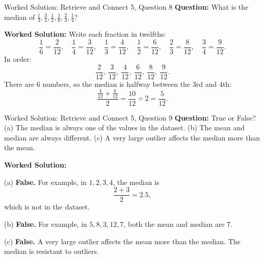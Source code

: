 \documentclass{beamer}
\begin{document}
\begin{frame}{Worked Solution: Retrieve and Connect 5, Question 8}
\textbf{Question:} What is the median of \(\frac{1}{3}, \frac{3}{4}, \frac{1}{2}, \frac{1}{6}, \frac{2}{3}, \frac{1}{4}\)?

\textbf{Worked Solution:}
Write each fraction in twelfths:
\[
\frac{1}{6}=\frac{2}{12},\quad
\frac{1}{4}=\frac{3}{12},\quad
\frac{1}{3}=\frac{4}{12},\quad
\frac{1}{2}=\frac{6}{12},\quad
\frac{2}{3}=\frac{8}{12},\quad
\frac{3}{4}=\frac{9}{12}.
\]
In order:
\[
\frac{2}{12},\ \frac{3}{12},\ \frac{4}{12},\ \frac{6}{12},\ \frac{8}{12},\ \frac{9}{12}.
\]
There are 6 numbers, so the median is halfway between the 3rd and 4th:
\[
\frac{\frac{4}{12} + \frac{6}{12}}{2}
= \frac{10}{12} \div 2
= \frac{5}{12}.
\]
\end{frame}

\begin{frame}{Worked Solution: Retrieve and Connect 5, Question 9}
\textbf{Question:} True or False?
(a) The median is always one of the values in the dataset.
(b) The mean and median are always different.
(c) A very large outlier affects the median more than the mean.

\textbf{Worked Solution:}

(a) \textbf{False.}
For example, in \(1, 2, 3, 4\), the median is
\[
\frac{2 + 3}{2} = 2.5,
\]
which is not in the dataset.

(b) \textbf{False.}
For example, in \(5, 8, 3, 12, 7\), both the mean and median are \(7\).

(c) \textbf{False.}
A very large outlier affects the mean more than the median. The median is resistant to outliers.
\end{frame}
\end{document}
